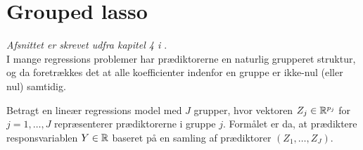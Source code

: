 \section{Grouped lasso}
\textit{Afsnittet er skrevet udfra kapitel 4 i \citep{hastie}}. \\[4mm]
%
I mange regressions problemer har prædiktorerne en naturlig grupperet struktur, og da foretrækkes det at alle koefficienter indenfor en gruppe er ikke-nul (eller nul) samtidig.

Betragt en lineær regressions model med $J$ grupper, hvor vektoren $Z_j \in \mathbb{R}^{p_j}$ for $j=1, \ldots, J$ repræsenterer prædiktorerne i gruppe $j$.
Formålet er da, at prædiktere responsvariablen $Y \in \mathbb{R}$ baseret på en samling af prædiktorer $(Z_1,\ldots,Z_J)$.

